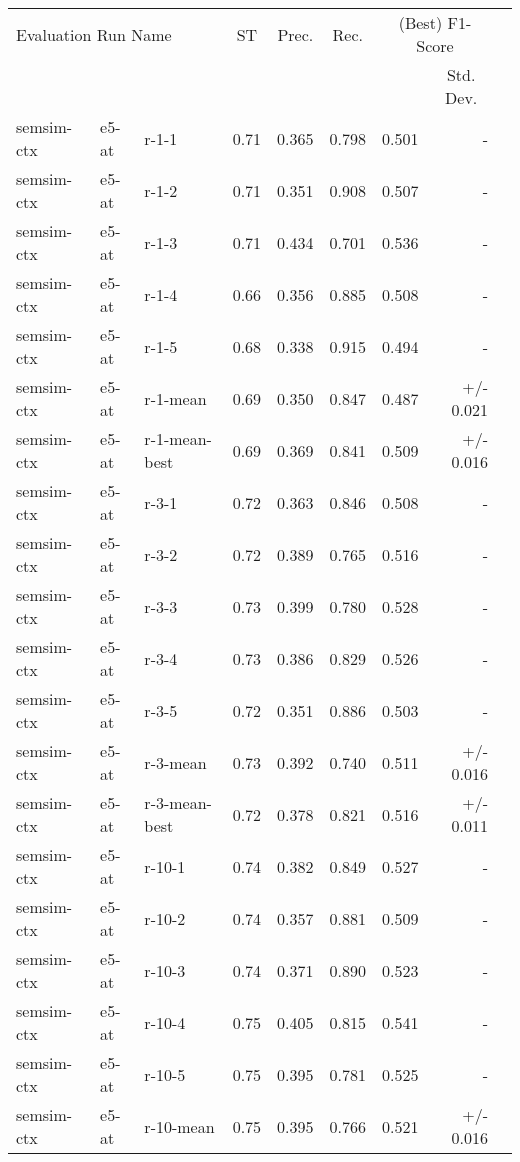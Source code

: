 \begin{table}[H]
\centering
\begin{tabular}{lllrrrrrr}
\toprule
\multicolumn{3}{l}{Evaluation Run Name}	& \multicolumn{1}{c}{ST} & \multicolumn{1}{c}{Prec.} & \multicolumn{1}{c}{Rec.} & \multicolumn{2}{c}{(Best) F1-Score}\\
\cmidrule{7-8}
\multicolumn{7}{l}{} & \multicolumn{1}{c}{Std. Dev.} \\
\midrule
semsim-ctx & e5-at & r-1-1 & 0.71 & 0.365 & 0.798 & 0.501 & - \\
semsim-ctx & e5-at & r-1-2 & 0.71 & 0.351 & 0.908 & 0.507 & - \\
semsim-ctx & e5-at & r-1-3 & 0.71 & 0.434 & 0.701 & 0.536 & - \\
semsim-ctx & e5-at & r-1-4 & 0.66 & 0.356 & 0.885 & 0.508 & - \\
semsim-ctx & e5-at & r-1-5 & 0.68 & 0.338 & 0.915 & 0.494 & - \\
semsim-ctx & e5-at & r-1-mean & 0.69 & 0.350 & 0.847 & 0.487 & +/- 0.021 \\
semsim-ctx & e5-at & r-1-mean-best & 0.69 & 0.369 & 0.841 & 0.509 & +/- 0.016 \\
\hline
semsim-ctx & e5-at & r-3-1 & 0.72 & 0.363 & 0.846 & 0.508 & - \\
semsim-ctx & e5-at & r-3-2 & 0.72 & 0.389 & 0.765 & 0.516 & - \\
semsim-ctx & e5-at & r-3-3 & 0.73 & 0.399 & 0.780 & 0.528 & - \\
semsim-ctx & e5-at & r-3-4 & 0.73 & 0.386 & 0.829 & 0.526 & - \\
semsim-ctx & e5-at & r-3-5 & 0.72 & 0.351 & 0.886 & 0.503 & - \\
semsim-ctx & e5-at & r-3-mean & 0.73 & 0.392 & 0.740 & 0.511 & +/- 0.016 \\
semsim-ctx & e5-at & r-3-mean-best & 0.72 & 0.378 & 0.821 & 0.516 & +/- 0.011 \\
\hline
semsim-ctx & e5-at & r-10-1 & 0.74 & 0.382 & 0.849 & 0.527 & - \\
semsim-ctx & e5-at & r-10-2 & 0.74 & 0.357 & 0.881 & 0.509 & - \\
semsim-ctx & e5-at & r-10-3 & 0.74 & 0.371 & 0.890 & 0.523 & - \\
semsim-ctx & e5-at & r-10-4 & 0.75 & 0.405 & 0.815 & 0.541 & - \\
semsim-ctx & e5-at & r-10-5 & 0.75 & 0.395 & 0.781 & 0.525 & - \\
semsim-ctx & e5-at & r-10-mean & 0.75 & 0.395 & 0.766 & 0.521 & +/- 0.016 \\

\end{tabular}
\end{table}
